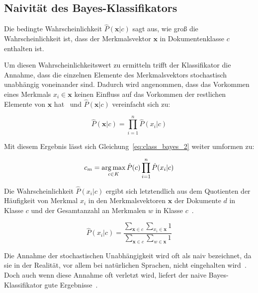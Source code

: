     \subsection{Naivität des Bayes-Klassifikators}
    Die bedingte Wahrscheinlichkeit $\hat{P}(\mathbf{x}|c)$ sagt aus, wie groß die Wahrscheinlichkeit ist, dass der Merkmalsvektor $\mathbf{x}$ in Dokumentenklasse $c$ enthalten ist.

    Um diesen Wahrscheinlichkeitswert zu ermitteln trifft der Klassifikator die Annahme, dass die einzelnen Elemente des Merkmalsvektors stochastisch unabhängig voneinander sind. Dadurch wird angenommen, dass das Vorkommen eines Merkmals $x_{i} \in \mathbf{x}$ keinen Einfluss auf das Vorkommen der restlichen Elemente von $\mathbf{x}$ hat~\cite{datamining, murphy} und $\hat{P}(\mathbf{x}|c)$ vereinfacht sich zu:

        \begin{equation}
            \hat{P}(\mathbf{x}|c) = \prod_{i=1}^{n} \hat{P}(x_{i}|c)
            \label{eq:cond_prod}
        \end{equation}

        Mit diesem Ergebnis lässt sich Gleichung~\ref{eq:class_bayes_2} weiter umformen zu:

        \begin{equation}
            c_{m} = \operatorname*{arg\,max}_{c \in K}\hat{P}(c)\prod_{i=1}^{n}\hat{P}(x_{i}|c)
            \label{eq:class_bayes_3}
        \end{equation}

        Die Wahrscheinlichkeit $\hat{P}(x_{i}|c)$ ergibt sich letztendlich aus dem Quotienten der Häufigkeit von Merkmal $x_{i}$ in den Merkmalsvektoren $\mathbf{x}$ der Dokumente $d$ in Klasse $c$ und der Gesamtanzahl an Merkmalen $w$ in Klasse $c$~\cite{IIR}.

        \begin{equation}
            \hat{P}(x_{i}|c) = \frac{\sum_{\mathbf{x} \in c}\sum_{x_{i} \in \mathbf{x}}1}{\sum_{\mathbf{x} \in c}\sum_{w \in \mathbf{x}}1}
            \label{eq:cond_prob_xi}
        \end{equation}

        Die Annahme der stochastischen Unabhängigkeit wird oft als naiv bezeichnet, da sie in der Realität, vor allem bei natürlichen Sprachen, nicht eingehalten wird~\cite{datamining}. 
        Doch auch wenn diese Annahme oft verletzt wird, liefert der naive Bayes-Klassifikator gute Ergebnisse~\cite{nbindependence,datamining,murphy}.
